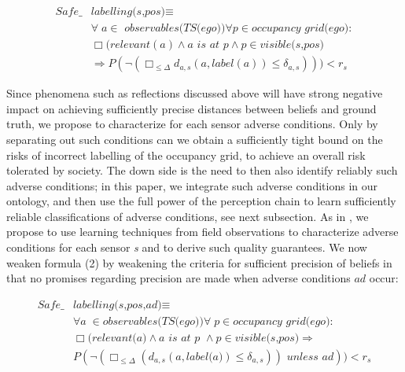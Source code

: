 \begin{align}\label{eq:safelabelling(s,pos)}
    \textit{Safe}\_&\textit{labelling(s,pos)} \equiv 					\\		
 & \forall a\in\textit{ observables(TS(ego))}\forall p \in \textit{occupancy grid(ego)}:\nonumber\\  
& \Box (\textit{relevant}(a) \land a \textit{ is at } p\land p\in \textit{visible(s,pos)} \nonumber\\
& \Rightarrow P(\neg( \Box_{\leq\Delta} d_{a,s}(a,\textit{label}(a))\leq\delta_{a,s}))) < r_s\nonumber
\end{align}

Since phenomena such as reflections discussed above will have strong negative impact on achieving sufficiently precise distances between beliefs and ground truth, we propose to characterize for each sensor adverse conditions. Only by separating out such conditions can we obtain a sufficiently tight bound on the risks of incorrect labelling of the occupancy grid, to achieve an overall risk tolerated by society. The down side is the need to then also identify reliably such adverse conditions; in this paper, we integrate such adverse conditions in our ontology, and then use the full power of the perception chain to learn sufficiently reliable classifications of adverse conditions, see next subsection. As in \cite{galbas}, we propose to use learning techniques from field observations to characterize adverse conditions for each sensor \textit{s} and to derive such quality guarantees. We now weaken formula (2) by weakening the criteria for sufficient precision of beliefs in that no promises regarding precision are made when adverse conditions $ad$ occur:

\begin{align}\label{eq:safelabelling(s,pos,ad)}
\textit{Safe}\_&\textit{labelling(s,pos,ad)} \equiv\\  			
&\forall a\in \textit{observables(TS(ego))}\forall p\in\textit{occupancy grid(ego)}\nonumber:\\
&\Box(\textit{relevant(a)} \land a\textit{ is at p }\land p\in\textit{visible(s,pos)} \Rightarrow\nonumber\\
&P(\neg(\Box_{\leq\Delta} (d_{a,s}(a, \textit{label(a)})\leq \delta_{a,s}))\textit{ unless } ad)) < r_s\nonumber
\end{align}

